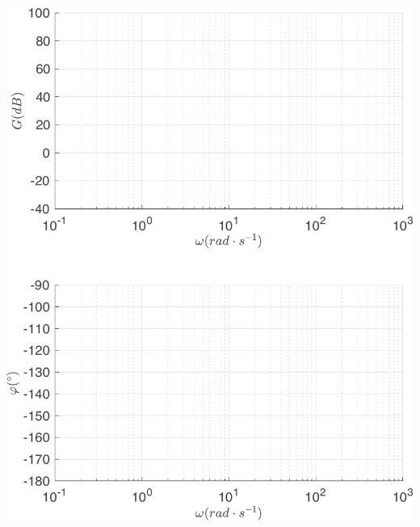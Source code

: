 \documentclass[10pt,fleqn]{article} %
\begin{document}
\begin{multicols}{2}
\begin{center}
\includegraphics[width=1.0\linewidth]{images/matlab/bode_total0.pdf}
\end{center}


\end{multicols}
\end{document}
